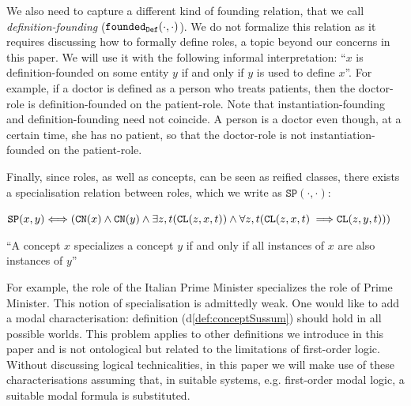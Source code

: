 \documentclass[sw]{iosart2x}
\newcommand{\bflist}{\begin{list}{}{\setlength{\topsep}{2mm}\setlength{\partopsep}{0mm}\setlength{\parsep}{0mm}\setlength{\leftmargin}{9mm}\setlength{\labelwidth}{8mm}}}
\newcommand{\eflist}{\end{list}}
\newcommand{\AxLabel}{\textrm{a}}
\newcommand{\DefLabel}{\textrm{d}}
\newcounter{cntax}
\newcommand{\myax}[1]{\refstepcounter{cntax}\begin{small}{\bf \AxLabel\thecntax\label{ax:#1}}\end{small}}
\newcounter{cntdef}
\newcommand{\mydf}[1]{\refstepcounter{cntdef}\begin{small}{\bf \DefLabel\thecntdef\label{def:#1}}\end{small}}
\newcommand{\mytext}[1]{``#1''}
\newcommand{\refdf}[1]{({\DefLabel}\ref{#1})}
\newcommand{\generalStyle}[1]{\texttt{#1}}
\newcommand{\biRel}[3]{\generalStyle{#1}(#2,#3)}
\newcommand{\uniRel}[2]{\generalStyle{#1}(#2)}
\newcommand{\biRelPar}[4]{\generalStyle{#1}_{\generalStyle{#4}}(#2,#3)}
\newcommand{\triRel}[4]{\generalStyle{#1}(#2,#3,#4)}
\newcommand{\myiff}{\Longleftrightarrow}
\newcommand{\myfi}{\hspace{0.9mm} \Longrightarrow}
\newcommand{\DOLCEConcept}[1]{\uniRel{{CN}}{#1}}
\newcommand{\DOLCECLby}[3]{\triRel{CL}{#1}{#2}{#3}}
\newcommand{\DOLCEConceptSubsum}[2]{\biRel{SP}{#1}{#2}}
\newcommand{\foundedDef}[2]{\biRelPar{\foundedTerm{passive}}{#1}{#2}{Def}}
\newcommand{\firstTimeKeyWord}[1]{\textit{#1}}
\newcommand{\foundedTerm}[1]{%
  \ifthenelse{\equal{#1}{passive}}{founded}{%
    \ifthenelse{\equal{#1}{verb}}{found}{%
      \ifthenelse{\equal{#1}{gerund}}{founding}{%
        ERROR!%
      }%
    }%
  }%
}
\newcommand{\TODOinline}[1]{{\color{red} #1
}}
\begin{document}
We also need to capture a different kind of founding relation, that we call \firstTimeKeyWord{definition-founding} ($\foundedDef{\cdot}{\cdot}$). We do not formalize this relation as it requires discussing how to formally define roles, a topic beyond our concerns in this paper. We will use it with the following informal interpretation: \mytext{$x$ is definition-founded on some entity $y$ if and only if $y$ is used to define $x$}.
For example, if a doctor is defined as a person who treats patients, then the doctor-role is definition-founded on the patient-role.  %
Note that instantiation-founding and definition-founding need not  coincide. A person is a doctor even though, at a certain time, she has no patient, so that the doctor-role is not instantiation-founded on the patient-role.

Finally, since roles, as well as concepts, can be seen as reified classes, there exists a specialisation relation between roles, which we write as $\DOLCEConceptSubsum{\cdot}{\cdot}$:
\bflist
\item[\mydf{conceptSussum}] $ \DOLCEConceptSubsum{x}{y} \myiff (\DOLCEConcept{x} \land \DOLCEConcept{y} \land \exists z,t (\DOLCECLby{z}{x}{t}) \land \forall z,t (\DOLCECLby{z}{x}{t} \myfi \DOLCECLby{z}{y}{t}) )$%
\item \mytext{A concept $x$ specializes a concept $y$ if and only if all instances of $x$ are also instances of $y$} 
\eflist
For example, the role of the Italian Prime Minister specializes the role of Prime Minister.
{This notion of specialisation is admittedly weak. One would like to add a modal characterisation: definition \refdf{def:conceptSussum} should hold in all possible worlds. This problem applies to other definitions we introduce in this paper %
and is not ontological but related to the limitations of first-order logic. Without discussing logical technicalities, in this paper we will make use of these characterisations assuming that, in suitable systems, e.g. first-order modal logic, a suitable modal formula is substituted.}
\end{document}
